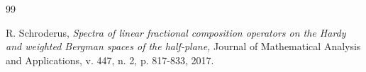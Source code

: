 \documentclass[11pt]{amsart}%
\numberwithin{equation}{section}
\theoremstyle{plain}
\theoremstyle{definition}
\theoremstyle{definition}
\begin{document}
\begin{thebibliography}{99}
		


 R. Schroderus, \emph{ Spectra of linear fractional composition operators on the Hardy and weighted Bergman spaces of the half-plane,} Journal of Mathematical Analysis and Applications, v. 447, n. 2, p. 817-833, 2017.


        
\end{thebibliography}
	
	

	
\end{document}
